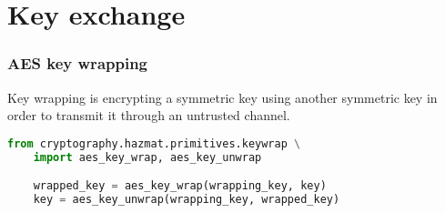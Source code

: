 \documentclass[a4paper, 12 pt]{memoir}
\begin{document}
\chapter{Key exchange}

\subsection{AES key wrapping}
Key wrapping is encrypting a symmetric key using another symmetric key in order to transmit it through an untrusted channel.

\begin{lstlisting}[language=Python]
from cryptography.hazmat.primitives.keywrap \
    import aes_key_wrap, aes_key_unwrap

    wrapped_key = aes_key_wrap(wrapping_key, key)
    key = aes_key_unwrap(wrapping_key, wrapped_key)
\end{lstlisting}
\end{document}

